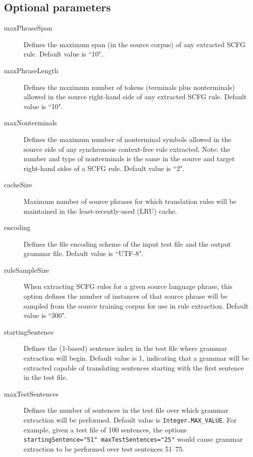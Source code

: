 \documentclass{pbml}
\begin{document}
\subsection{Optional parameters}
\begin{description}

	\item[maxPhraseSpan] Defines the maximum span (in the source corpus) of any extracted SCFG rule. Default value is ``10".

	\item[maxPhraseLength] Defines the maximum number of tokens (terminals plus nonterminals) allowed in the source right-hand side of any extracted SCFG rule. Default value is ``10".

	\item[maxNonterminals] Defines the maximum number of nonterminal symbols allowed in the source side of any synchronous context-free rule extracted. Note: the number and type of nonterminals is the same in the source and target right-hand sides of a SCFG rule. Default value is ``2".

	\item[cacheSize] Maximum number of source phrases for which translation rules will be maintained in the least-recently-used (LRU) cache.

	\item[encoding] Defines the file encoding scheme of the input test file and the output grammar file. Default value is ``UTF-8".


	\item[ruleSampleSize] When extracting SCFG rules for a given source language phrase, this option defines the number of instances of that source phrase will be sampled from the source training corpus for use in rule extraction. Default value is ``300".
	
	\item[startingSentence] Defines the (1-based) sentence index in the test file where grammar extraction will begin. Default value is 1, indicating that a grammar will be extracted capable of translating sentences starting with the first sentence in the test file.

	\item[maxTestSentences] Defines the number of sentences in the test file over which grammar extraction will be performed. Default value is {\tt Integer.MAX\_VALUE}. For example, given a test file of 100 sentences, the options {\tt startingSentence="51"  maxTestSentences="25"} would cause grammar extraction to be performed over test sentences 51--75.

\end{description}
\end{document}
